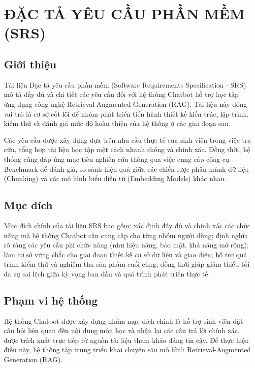 \chapter{ĐẶC TẢ YÊU CẦU PHẦN MỀM (SRS)}

\section{Giới thiệu}

Tài liệu Đặc tả yêu cầu phần mềm (Software Requirements Specification - SRS) mô tả đầy đủ và chi tiết các yêu cầu đối với hệ thống Chatbot hỗ trợ học tập ứng dụng công nghệ Retrieval-Augmented Generation (RAG). Tài liệu này đóng vai trò là cơ sở cốt lõi để nhóm phát triển tiến hành thiết kế kiến trúc, lập trình, kiểm thử và đánh giá mức độ hoàn thiện của hệ thống ở các giai đoạn sau.

Các yêu cầu được xây dựng dựa trên nhu cầu thực tế của sinh viên trong việc tra cứu, tổng hợp tài liệu học tập một cách nhanh chóng và chính xác. Đồng thời, hệ thống cũng đáp ứng mục tiêu nghiên cứu thông qua việc cung cấp công cụ Benchmark để đánh giá, so sánh hiệu quả giữa các chiến lược phân mảnh dữ liệu (Chunking) và các mô hình biểu diễn từ (Embedding Models) khác nhau.

\section{Mục đích}

Mục đích chính của tài liệu SRS bao gồm: xác định đầy đủ và chính xác các chức năng mà hệ thống Chatbot cần cung cấp cho từng nhóm người dùng; định nghĩa rõ ràng các yêu cầu phi chức năng (như hiệu năng, bảo mật, khả năng mở rộng); làm cơ sở vững chắc cho giai đoạn thiết kế cơ sở dữ liệu và giao diện; hỗ trợ quá trình kiểm thử và nghiệm thu sản phẩm cuối cùng; đồng thời giúp giảm thiểu tối đa sự sai lệch giữa kỳ vọng ban đầu và quá trình phát triển thực tế.

\section{Phạm vi hệ thống}

Hệ thống Chatbot được xây dựng nhằm mục đích chính là hỗ trợ sinh viên đặt câu hỏi liên quan đến nội dung môn học và nhận lại các câu trả lời chính xác, được trích xuất trực tiếp từ nguồn tài liệu tham khảo đáng tin cậy. Để thực hiện điều này, hệ thống tập trung triển khai chuyên sâu mô hình Retrieval-Augmented Generation (RAG).

